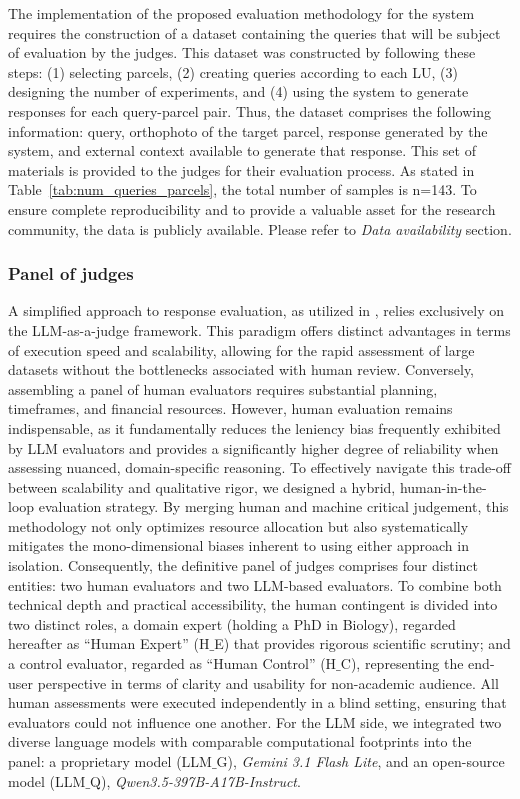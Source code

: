 \documentclass[preprint,review,12pt,authoryear]{elsarticle}
\begin{document}
The implementation of the proposed evaluation methodology for the system requires the construction of a dataset containing the queries that will be subject of evaluation by the judges. This dataset was constructed by following these steps: (1) selecting parcels, (2) creating queries according to each LU, (3) designing the number of experiments, and (4) using the system to generate responses for each query-parcel pair. Thus, the dataset comprises the following information: query, orthophoto of the target parcel, response generated by the system, and external context available to generate that response. This set of materials is provided to the judges for their evaluation process. As stated in Table~\ref{tab:num_queries_parcels}, the total number of samples is n=143. To ensure complete reproducibility and to provide a valuable asset for the research community, the data is publicly available. Please refer to \textit{Data availability} section. 

\subsubsection{Panel of judges}

A simplified approach to response evaluation, as utilized in \citet{juan_2025}, relies exclusively on the LLM-as-a-judge framework. This paradigm offers distinct advantages in terms of execution speed and scalability, allowing for the rapid assessment of large datasets without the bottlenecks associated with human review. Conversely, assembling a panel of human evaluators requires substantial planning, timeframes, and financial resources. However, human evaluation remains indispensable, as it fundamentally reduces the leniency bias frequently exhibited by LLM evaluators \citep{gu_survey_2026} and provides a significantly higher degree of reliability when assessing nuanced, domain-specific reasoning. To effectively navigate this trade-off between scalability and qualitative rigor, we designed a hybrid, human-in-the-loop evaluation strategy. By merging human and machine critical judgement, this methodology not only optimizes resource allocation but also systematically mitigates the mono-dimensional biases inherent to using either approach in isolation. Consequently, the definitive panel of judges comprises four distinct entities: two human evaluators and two LLM-based evaluators. To combine both technical depth and practical accessibility, the human contingent is divided into two distinct roles, a domain expert (holding a PhD in Biology), regarded hereafter as ``Human Expert'' (H$\_$E) that provides rigorous scientific scrutiny; and a control evaluator, regarded as ``Human Control'' (H$\_$C), representing the end-user perspective in terms of clarity and usability for non-academic audience. All human assessments were executed independently in a blind setting, ensuring that evaluators could not influence one another. For the LLM side, we integrated two diverse language models with comparable computational footprints into the panel: a proprietary model (LLM$\_$G), \textit{Gemini 3.1 Flash Lite}, and an open-source model (LLM$\_$Q), \textit{Qwen3.5-397B-A17B-Instruct}.
\end{document}
